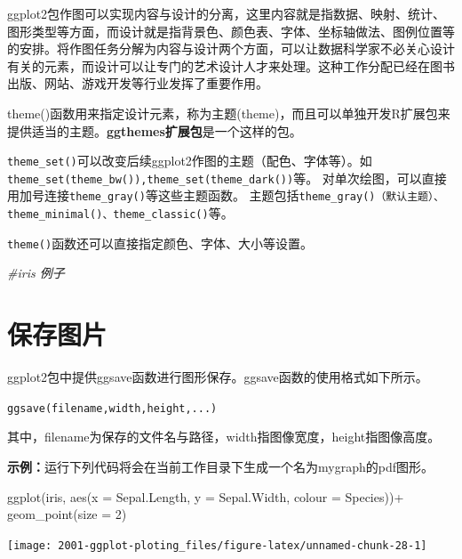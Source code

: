 \documentclass[
]{book}
\newenvironment{Shaded}{\begin{snugshade}}{\end{snugshade}}
\newcommand{\AttributeTok}[1]{\textcolor[rgb]{0.77,0.63,0.00}{#1}}
\newcommand{\CommentTok}[1]{\textcolor[rgb]{0.56,0.35,0.01}{\textit{#1}}}
\newcommand{\DecValTok}[1]{\textcolor[rgb]{0.00,0.00,0.81}{#1}}
\newcommand{\FunctionTok}[1]{\textcolor[rgb]{0.00,0.00,0.00}{#1}}
\newcommand{\NormalTok}[1]{#1}
\newcommand{\SpecialCharTok}[1]{\textcolor[rgb]{0.00,0.00,0.00}{#1}}
\begin{document}
ggplot2包作图可以实现内容与设计的分离，这里内容就是指数据、映射、统计、图形类型等方面，而设计就是指背景色、颜色表、字体、坐标轴做法、图例位置等的安排。将作图任务分解为内容与设计两个方面，可以让数据科学家不必关心设计有关的元素，而设计可以让专门的艺术设计人才来处理。这种工作分配已经在图书出版、网站、游戏开发等行业发挥了重要作用。

theme()函数用来指定设计元素，称为主题(theme)，而且可以单独开发R扩展包来提供适当的主题。\textbf{ggthemes扩展包}是一个这样的包。

\texttt{theme\_set()}可以改变后续ggplot2作图的主题（配色、字体等）。如\texttt{theme\_set(theme\_bw()),theme\_set(theme\_dark())}等。
对单次绘图，可以直接用加号连接\texttt{theme\_gray()}等这些主题函数。
主题包括\texttt{theme\_gray()（默认主题）、theme\_minimal()、theme\_classic()}等。

\texttt{theme()}函数还可以直接指定颜色、字体、大小等设置。

\begin{Shaded}
\begin{Highlighting}[]
\CommentTok{\#iris 例子}
\end{Highlighting}
\end{Shaded}

\hypertarget{ux4fddux5b58ux56feux7247}{%
\section{保存图片}\label{ux4fddux5b58ux56feux7247}}

ggplot2包中提供ggsave函数进行图形保存。ggsave函数的使用格式如下所示。

\texttt{ggsave(filename,width,height,...)}

其中，filename为保存的文件名与路径，width指图像宽度，height指图像高度。

\textbf{示例：}运行下列代码将会在当前工作目录下生成一个名为mygraph的pdf图形。

\begin{Shaded}
\begin{Highlighting}[]
\FunctionTok{ggplot}\NormalTok{(iris, }\FunctionTok{aes}\NormalTok{(}\AttributeTok{x =}\NormalTok{ Sepal.Length, }\AttributeTok{y =}\NormalTok{ Sepal.Width, }\AttributeTok{colour =}\NormalTok{ Species))}\SpecialCharTok{+}
  \FunctionTok{geom\_point}\NormalTok{(}\AttributeTok{size =} \DecValTok{2}\NormalTok{)}
\end{Highlighting}
\end{Shaded}

\begin{center}\texttt{[image: 2001-ggplot-ploting\_files/figure-latex/unnamed-chunk-28-1]} \end{center}
\end{document}
